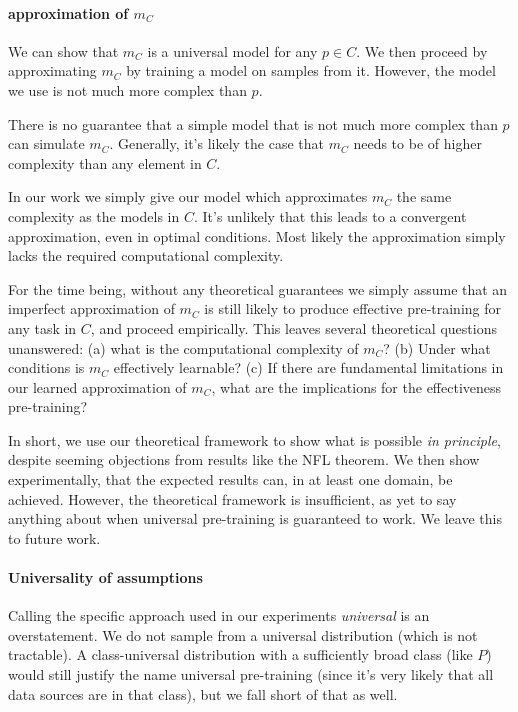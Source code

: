 \documentclass{article} %
\begin{document}
\paragraph{approximation of $m_C$} We can show that $m_C$ is a universal model for any $p\in C$. We then proceed by approximating $m_C$ by training a model on samples from it. However, the model we use is not much more complex than $p$.

There is no guarantee that a simple model that is not much more complex than $p$ can simulate $m_C$. Generally, it's likely the case that $m_C$ needs to be of higher complexity than any element in $C$.\footnotemark


In our work we simply give our model which approximates $m_C$ the same complexity as the models in $C$. It's unlikely that this leads to a convergent approximation, even in optimal conditions. Most likely the approximation simply lacks the required computational complexity. 

For the time being, without any theoretical guarantees we simply assume that an imperfect approximation of $m_C$ is still likely to produce effective pre-training for any task in $C$, and proceed empirically. This leaves several theoretical questions unanswered: (a) what is the computational complexity of $m_C$? (b) Under what conditions is $m_C$ effectively learnable? (c) If there are fundamental limitations in our learned approximation of $m_C$, what are the implications for the effectiveness pre-training?

In short, we use our theoretical framework to show what is possible \emph{in principle}, despite seeming objections from results like the NFL theorem. We then show experimentally, that the expected results can, in at least one domain, be achieved. However, the theoretical framework is insufficient, as yet to say anything about when universal pre-training is guaranteed to work. We leave this to future work.

\paragraph{Universality of assumptions} Calling the specific approach used in our experiments \emph{universal} is an overstatement. We do not sample from a universal distribution (which is not tractable). A class-universal distribution with a sufficiently broad class (like $P$) would still justify the name universal pre-training (since it's very likely that all data sources are in that class), but we fall short of that as well.
\end{document}
